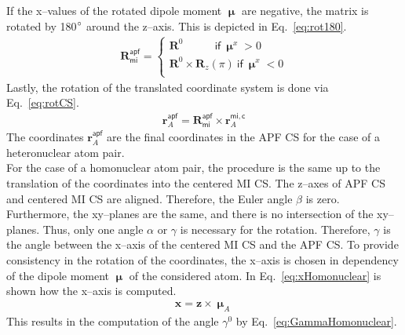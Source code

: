 If the x--values of the rotated dipole moment $\bm{\upmu}$ are negative,
the matrix is rotated by 180$\degree$ around the z--axis. This is depicted in Eq.~\eqref{eq:rot180}.
\begin{align}
	\label{eq:rot180}
	\textbf{R}_\mathsf{mi}^\mathsf{apf} = \begin{cases}
		\textbf{R}^0 ~~~~~~~~~~~~~\mathsf{if}~ \bm{\upmu}^x > 0  \\
		 \textbf{R}^0 \times \textbf{R}_z(\pi) ~\mathsf{if}~ \bm{\upmu}^x < 0  \\
	\end{cases}
\end{align}
Lastly, the rotation of the translated coordinate system is done via Eq.~\eqref{eq:rotCS}.
\begin{align}
	\label{eq:rotCS}
	\textbf{r}^\mathsf{apf}_A = \textbf{R}_\mathsf{mi}^\mathsf{apf} \times \textbf{r}^\mathsf{mi,c}_A
\end{align} 
The coordinates $\textbf{r}^\mathsf{apf}_A$ are the final coordinates in the APF CS for the case of a heteronuclear atom pair.\\ 
For the case of a homonuclear atom pair,
the procedure is the same up to the translation of the coordinates into the centered MI CS.
The z--axes of APF CS and centered MI CS are aligned.
Therefore, the Euler angle $\beta$ is zero. Furthermore, the xy--planes are the same,
and there is no intersection of the xy--planes.
Thus, only one angle $\alpha$ or $\gamma$ is necessary for the rotation.
Therefore, $\gamma$ is the angle between the x--axis of the centered MI CS
and the APF CS. To provide consistency in the rotation of the coordinates,
the x--axis is chosen in dependency of the dipole moment $\bm{\upmu}$ of the considered atom.
In Eq.~\eqref{eq:xHomonuclear} is shown how the x--axis is computed.
\begin{align}
	\label{eq:xHomonuclear}
	\textbf{x} = \textbf{z} \times \bm{\upmu}_A
\end{align}
This results in the computation of the angle $\gamma^0$ by Eq.~\eqref{eq:GammaHomonuclear}.

